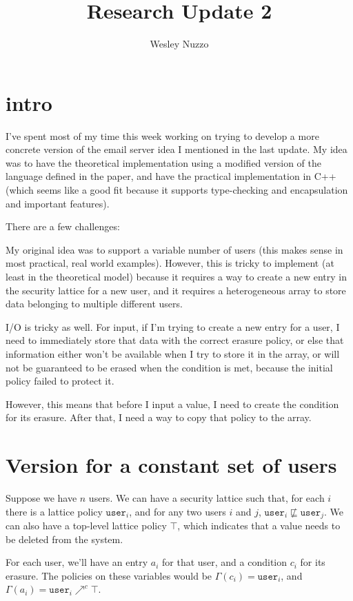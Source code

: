 \documentclass[11pt, oneside]{article}   	%
\title{Research Update 2}
\author{Wesley Nuzzo}
\begin{document}
\maketitle

\section{intro}

I've spent most of my time this week working on trying to develop a more concrete version of the email server idea I mentioned in the last update.
My idea was to have the theoretical implementation using a modified version of the language defined in the paper, and have the practical implementation in C++ (which seems like a good fit because it supports type-checking and encapsulation and important features).

There are a few challenges:

My original idea was to support a variable number of users (this makes sense in most practical, real world examples). However, this is tricky to implement (at least in the theoretical model) because it requires a way to create a new entry in the security lattice for a new user, and it requires a heterogeneous array to store data belonging to multiple different users.

I/O is tricky as well. For input, if I'm trying to create a new entry for a user, I need to immediately store that data with the correct erasure policy, or else that information either won't be available when I try to store it in the array, or will not be guaranteed to be erased when the condition is met, because the initial policy failed to protect it.

However, this means that before I input a value, I need to create the condition for its erasure.
After that, I need a way to copy that policy to the array.

\section{Version for a constant set of users}
Suppose we have $n$ users. We can have a security lattice such that, for each $i$ there is a lattice policy $\texttt{user}_i$, and for any two users $i$ and $j$, $\texttt{user}_i \not\sqsubseteq \texttt{user}_j$.
We can also have a top-level lattice policy $\top$, which indicates that a value needs to be deleted from the system.

For each user, we'll have an entry $a_i$ for that user, and a condition $c_i$ for its erasure. The policies on these variables would be $\Gamma(c_i)=\texttt{user}_i$, and $\Gamma(a_i) = \texttt{user}_i\nearrow^c\top$.
\end{document}
